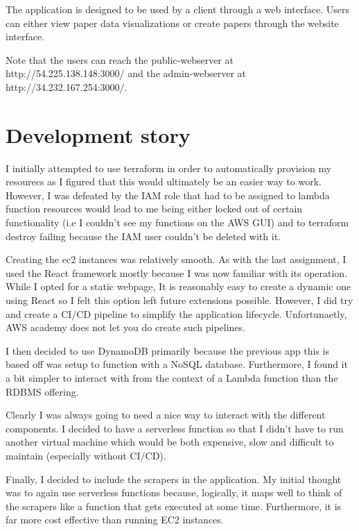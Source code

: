 \documentclass[12pt]{article}
\begin{document}
The application is designed to be used by a client through a web interface. Users can either view paper data visualizations or create papers through the website interface. 

Note that the users can reach the public-webserver at http://54.225.138.148:3000/ and the admin-webserver at http://34.232.167.254:3000/.
\section{Development story}

I initially attempted to use terraform in order to automatically provision my resourecs as I figured that this would ultimately be an easier way to work.
However, I was defeated by the IAM role that had to be assigned to lambda function resources would lead to me being either locked out of certain functionality (i.e I couldn't see my functions on the AWS GUI) and to terraform destroy failing because the IAM user couldn't be deleted with it.

Creating the ec2 instances was relatively smooth. As with the last assignment, I used the React framework mostly because I was now familiar with its operation. While I opted for a static webpage, It is reasonably easy to create a dynamic one using React so I felt this option left future extensions possible.
However, I did try and create a CI/CD pipeline to simplify the application lifecycle. Unfortunaetly, AWS academy does not let you do create such pipelines.

I then decided to use DynamoDB primarily because the previous app this is based off was setup to function with a NoSQL database. Furthermore, I found it a bit simpler to interact with from the context of a Lambda function than the RDBMS offering.

Clearly I was always going to need a nice way to interact with the different components. I decided to have a serverless function so that I didn't have to run another virtual machine which would be both expensive, slow and difficult to maintain (especially without CI/CD).

Finally, I decided to include the scrapers in the application. My initial thought was to again use serverless functions because, logically, it maps well to think of the scrapers like a function that gets executed at some time. Furthermore, it is far more cost effective than running EC2 instances.

\end{document}
